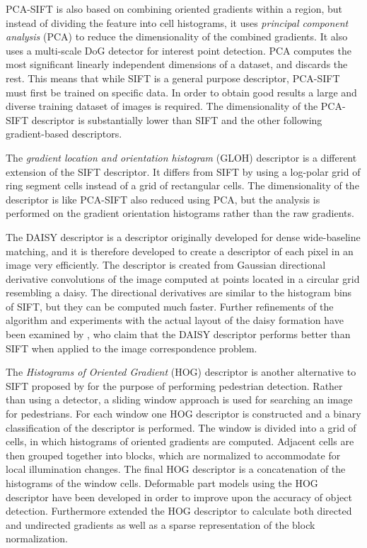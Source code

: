 \documentclass[thesis.tex]{subfiles}
\begin{document}
PCA-SIFT \cite{ke2004pca} is also based on combining oriented gradients within a region, but instead of dividing the feature into cell histograms, it uses \emph{principal component analysis} (PCA) to reduce the dimensionality of the combined gradients. It also uses a multi-scale DoG detector for interest point detection. PCA computes the most significant linearly independent dimensions of a dataset, and discards the rest. This means that while SIFT is a general purpose descriptor, PCA-SIFT must first be trained on specific data. In order to obtain good results a large and diverse training dataset of images is required. The dimensionality of the PCA-SIFT descriptor is substantially lower than SIFT and the other following gradient-based descriptors.

The \emph{gradient location and orientation histogram} (GLOH) descriptor \cite{mikolajczyk2005performance} is a different extension of the SIFT descriptor. It differs from SIFT by using a log-polar grid of ring segment cells instead of a grid of rectangular cells. The dimensionality of the descriptor is like PCA-SIFT also reduced using PCA, but the analysis is performed on the gradient orientation histograms rather than the raw gradients.

The DAISY descriptor \cite{tola2008fast} is a descriptor originally developed for dense wide-baseline matching, and it is therefore developed to create a descriptor of each pixel in an image very efficiently. The descriptor is created from Gaussian directional derivative convolutions of the image computed at points located in a circular grid resembling a daisy. The directional derivatives are similar to the histogram bins of SIFT, but they can be computed much faster. Further refinements of the algorithm and experiments with the actual layout of the daisy formation have been examined by \citet{winder2009picking}, who claim that the DAISY descriptor performs better than SIFT when applied to the image correspondence problem.

The \emph{Histograms of Oriented Gradient} (HOG) descriptor is another alternative to SIFT proposed by \citet{dalal2005histograms} for the purpose of performing pedestrian detection. Rather than using a detector, a sliding window approach is used for searching an image for pedestrians. For each window one HOG descriptor is constructed and a binary classification of the descriptor is performed. The window is divided into a grid of cells, in which histograms of oriented gradients are computed. Adjacent cells are then grouped together into blocks, which are normalized to accommodate for local illumination changes. The final HOG descriptor is a concatenation of the histograms of the window cells. Deformable part models using the HOG descriptor have been developed \cite{felzenszwalb2008discriminatively} in order to improve upon the accuracy of object detection. Furthermore \citet{felzenszwalb2009object} extended the HOG descriptor to calculate both directed and undirected gradients as well as a sparse representation of the block normalization.
\end{document}
